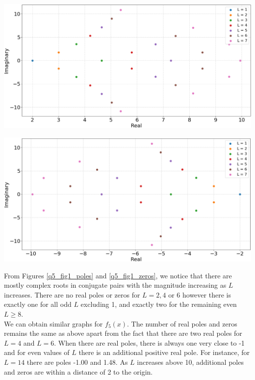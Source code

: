 \documentclass[12pt, a4paper]{article}
\begin{document}
\vspace{0.3cm}
\begin{minipage}{\textwidth}
	\includegraphics[width=\linewidth]{q5_fig1_poles}
	\label{q5_fig1_poles}
\end{minipage}
\vspace{0.1cm}

\vspace{0.3cm}
\begin{minipage}{\textwidth}
	\includegraphics[width=\linewidth]{q5_fig1_zeros}
	\label{q5_fig1_zeros}
\end{minipage}
\vspace{0.1cm}

From Figures \ref{q5_fig1_poles} and \ref{q5_fig1_zeros}, we notice that there are mostly complex roots
in conjugate pairs with the magnitude increasing as $L$ increases. There are no real poles or zeros for 
$L = 2, 4 \text{ or } 6$ however there is exactly one for all odd $L$ excluding 1, and exactly two for
the remaining even $L\geq 8$.
\\

We can obtain similar graphs for $f_{5}(x)$. The number of real poles and zeros remains the same as above
apart from the fact that there are two real poles for $L = 4$ and $L = 6$. When there are real poles, 
there is always one very close to -1 and for even values of $L$ there is an additional positive real pole. 
For instance, for $L = 14$ there are poles -1.00 and 1.48. As $L$ increases above 10, additional poles 
and zeros are within a distance of 2 to the origin.
\\
\end{document}

